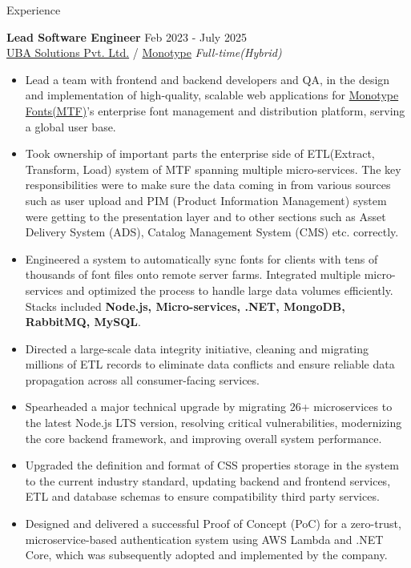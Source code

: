 \documentclass{resume} %
\begin{document}
\begin{rSection}{Experience}

\textbf{Lead Software Engineer} \hfill Feb 2023 - July 2025 \\
\href{https://uba-solutions.com/}{UBA Solutions Pvt. Ltd.} / \href{https://www.monotype.com/}{Monotype} \hfill \textit{Full-time(Hybrid)}
 \begin{itemize}
    \itemsep -3pt {}
    \item Lead a team with frontend and backend developers and QA, in the design and implementation of high-quality, scalable web applications for \href{https://www.monotype.com/}{Monotype Fonts(MTF)}'s enterprise font management and distribution platform, serving a global user base.
    \item Took ownership of important parts the enterprise side of ETL(Extract, Transform, Load) system of MTF spanning multiple micro-services. The key responsibilities were to make sure the data coming in from various sources such as user upload and PIM (Product Information Management) system were getting to the presentation layer and to other sections such as Asset Delivery System (ADS), Catalog Management System (CMS) etc. correctly.
    \item Engineered a system to automatically sync fonts for clients with tens of thousands of font files onto remote server farms. Integrated multiple micro-services and optimized the process to handle large data volumes efficiently. Stacks included \textbf{Node.js, Micro-services, .NET, MongoDB, RabbitMQ, MySQL}.
    \item Directed a large-scale data integrity initiative, cleaning and migrating millions of ETL records to eliminate data conflicts and ensure reliable data propagation across all consumer-facing services.
    \item Spearheaded a major technical upgrade by migrating 26+ microservices to the latest Node.js LTS version, resolving critical vulnerabilities, modernizing the core backend framework, and improving overall system performance.
    \item Upgraded the definition and format of CSS properties storage in the system to the current industry standard, updating backend and frontend services, ETL and database schemas to ensure compatibility third party services.
    \item Designed and delivered a successful Proof of Concept (PoC) for a zero-trust, microservice-based authentication system using AWS Lambda and .NET Core, which was subsequently adopted and implemented by the company.

\end{itemize}
\end{rSection}
\end{document}
